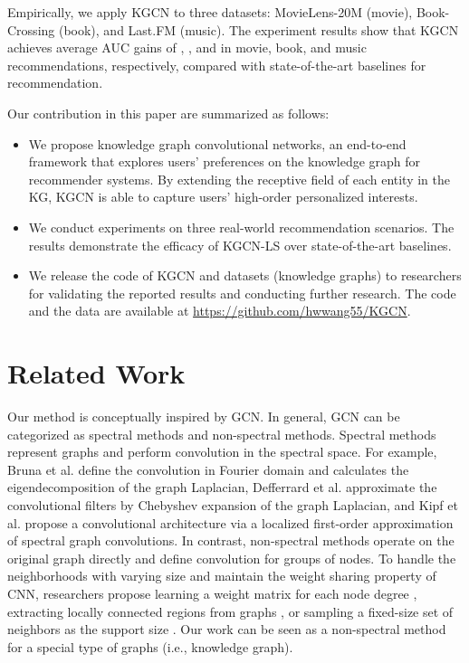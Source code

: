 \documentclass[sigconf]{acmart}
\begin{document}
	Empirically, we apply KGCN to three datasets: MovieLens-20M (movie), Book-Crossing (book), and Last.FM (music).
	The experiment results show that KGCN achieves average AUC gains of , , and  in movie, book, and music recommendations, respectively, compared with state-of-the-art baselines for recommendation.
	
	Our contribution in this paper are summarized as follows:
	\begin{itemize}
		\item We propose knowledge graph convolutional networks, an end-to-end framework that explores users' preferences on the knowledge graph for recommender systems. By extending the receptive field of each entity in the KG, KGCN is able to capture users' high-order personalized interests.
		\item We conduct experiments on three real-world recommendation scenarios. The results demonstrate the efficacy of KGCN-LS over state-of-the-art baselines.
		\item We release the code of KGCN and datasets (knowledge graphs) to researchers for validating the reported results and conducting further research. The code and the data are available at \url{https://github.com/hwwang55/KGCN}.
	\end{itemize}



\section{Related Work}
	Our method is conceptually inspired by GCN.
	In general, GCN can be categorized as spectral methods and non-spectral methods.
	Spectral methods represent graphs and perform convolution in the spectral space.
	For example, Bruna et al. \cite{bruna2014spectral} define the convolution in Fourier domain and calculates the eigendecomposition of the graph Laplacian,
	Defferrard et al. \cite{defferrard2016convolutional} approximate the convolutional filters by Chebyshev expansion of the graph Laplacian,
	and Kipf et al. \cite{kipf2017semi} propose a convolutional architecture via a localized first-order approximation of spectral graph convolutions.
	In contrast, non-spectral methods operate on the original graph directly and define convolution for groups of nodes.
	To handle the neighborhoods with varying size and maintain the weight sharing property of CNN, researchers propose learning a weight matrix for each node degree \cite{duvenaud2015convolutional}, extracting locally connected regions from graphs \cite{niepert2016learning}, or sampling a fixed-size set of neighbors as the support size \cite{hamilton2017inductive}.
	Our work can be seen as a non-spectral method for a special type of graphs (i.e., knowledge graph).
	
\end{document}
